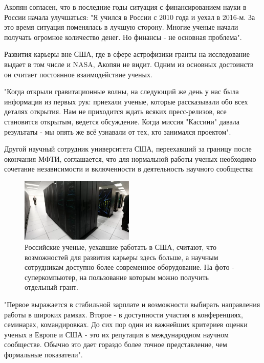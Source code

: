 Акопян согласен, что в последние годы ситуация с финансированием науки в России начала улучшаться: "Я учился в России с 2010 года и уехал в 2016-м. За это время ситуация поменялась в лучшую сторону. Многие ученые начали получать огромное количество денег. Но финансы - не основная проблема".

Развития карьеры вне США, где в сфере астрофизики гранты на исследование выдает в том числе и NASA, Акопян не видит. Одним из основных достоинств он считает постоянное взаимодействие ученых.

"Когда открыли гравитационные волны, на следующий же день у нас была информация из первых рук: приехали ученые, которые рассказывали обо всех деталях открытия. Нам не приходится ждать всяких пресс-релизов, все становится открытым, ведется обсуждение. Когда миссия "Кассини" давала результаты - мы опять же всё узнавали от тех, кто занимался проектом".

Другой научный сотрудник университета США, переехавший за границу после окончания МФТИ, соглашается, что для нормальной работы ученых необходимо сочетание независимости и включенности в деятельность научного сообщества:

\begin{figure}
    \begin{center}
        \includegraphics[width=0.48\textwidth]{img/supercomputer.png}
    \end{center}
    \caption{Российские ученые, уехавшие работать в США, считают, что возможностей для развития карьеры здесь больше, а научным сотрудникам доступно более современное оборудование. На фото - суперкомпьютер, на пользование которым можно получить отдельный грант.}
\end{figure}
"Первое выражается в стабильной зарплате и возможности выбирать направления работы в широких рамках. Второе - в доступности участия в конференциях, семинарах, командировках. До сих пор один из важнейших критериев оценки ученых в Европе и США - это их репутация в международном научном сообществе. Обычно это дает гораздо более точное представление, чем формальные показатели".

